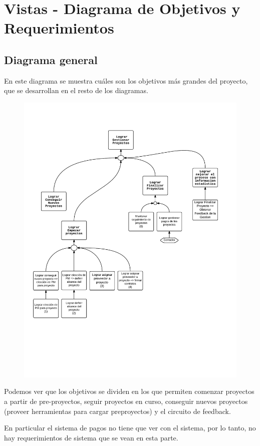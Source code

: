 \section{Vistas - Diagrama de Objetivos y Requerimientos}
\subsection{Diagrama general}
En este diagrama se muestra cuáles son los objetivos más grandes del proyecto, que se desarrollan en el resto de los diagramas.
\begin{figure}[H]
\includegraphics[width=\textwidth, clip=true, trim=15pt 170pt 15pt 80pt]{imagenes/objetivos/objetivos10.pdf}
\end{figure}
Podemos ver que los objetivos se dividen en los que permiten comenzar proyectos a partir de pre-proyectos, seguir proyectos en curso, conseguir nuevos proyectos (proveer herramientas para cargar preproyectos) y el circuito de feedback.

En particular el sistema de pagos no tiene que ver con el sistema, por lo tanto, no hay requerimientos de sistema que se vean en esta parte.

